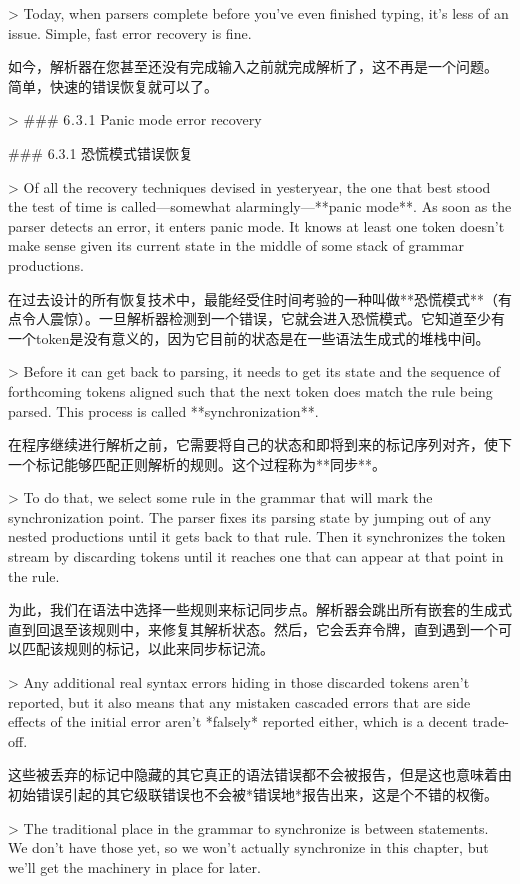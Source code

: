 \documentclass[cn,11pt,chinese]{elegantbook}
\begin{document}
> Today, when parsers complete before you’ve even finished typing, it’s less of an issue. Simple, fast error recovery is fine.

如今，解析器在您甚至还没有完成输入之前就完成解析了，这不再是一个问题。 简单，快速的错误恢复就可以了。

> ### 6 . 3 . 1 Panic mode error recovery

### 6.3.1 恐慌模式错误恢复

> Of all the recovery techniques devised in yesteryear, the one that best stood the test of time is called—somewhat alarmingly—**panic mode**. As soon as the parser detects an error, it enters panic mode. It knows at least one token doesn’t make sense given its current state in the middle of some stack of grammar productions.

在过去设计的所有恢复技术中，最能经受住时间考验的一种叫做**恐慌模式**（有点令人震惊）。一旦解析器检测到一个错误，它就会进入恐慌模式。它知道至少有一个token是没有意义的，因为它目前的状态是在一些语法生成式的堆栈中间。

> Before it can get back to parsing, it needs to get its state and the sequence of forthcoming tokens aligned such that the next token does match the rule being parsed. This process is called **synchronization**.

在程序继续进行解析之前，它需要将自己的状态和即将到来的标记序列对齐，使下一个标记能够匹配正则解析的规则。这个过程称为**同步**。

> To do that, we select some rule in the grammar that will mark the synchronization point. The parser fixes its parsing state by jumping out of any nested productions until it gets back to that rule. Then it synchronizes the token stream by discarding tokens until it reaches one that can appear at that point in the rule.

为此，我们在语法中选择一些规则来标记同步点。解析器会跳出所有嵌套的生成式直到回退至该规则中，来修复其解析状态。然后，它会丢弃令牌，直到遇到一个可以匹配该规则的标记，以此来同步标记流。

> Any additional real syntax errors hiding in those discarded tokens aren’t reported, but it also means that any mistaken cascaded errors that are side effects of the initial error aren’t *falsely* reported either, which is a decent trade-off.

这些被丢弃的标记中隐藏的其它真正的语法错误都不会被报告，但是这也意味着由初始错误引起的其它级联错误也不会被*错误地*报告出来，这是个不错的权衡。

> The traditional place in the grammar to synchronize is between statements. We don’t have those yet, so we won’t actually synchronize in this chapter, but we’ll get the machinery in place for later.
\end{document}
